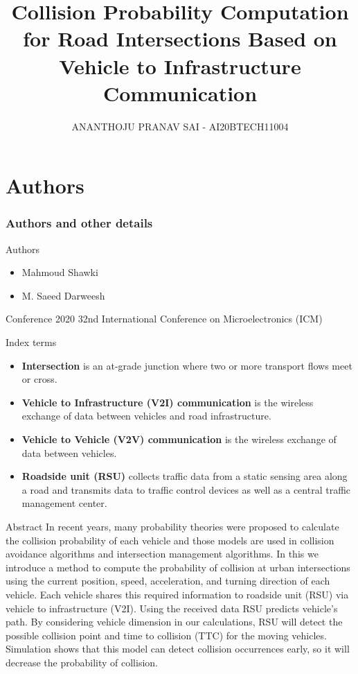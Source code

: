 \documentclass{beamer}
\title{Collision Probability Computation for Road
Intersections Based on Vehicle to Infrastructure
Communication}
\author{ANANTHOJU PRANAV SAI - AI20BTECH11004}
\begin{document}
\begin{frame}
\titlepage
\end{frame}
\section{Authors}
\begin{frame}
\frametitle{Authors and other details}
\begin{block}{Authors}
\begin{itemize}
    \item Mahmoud Shawki
    \item M. Saeed Darweesh
\end{itemize}
\end{block}
\begin{block}{Conference}
2020 32nd International Conference on Microelectronics (ICM)
\end{block}
\end{frame}
\begin{frame}
    \begin{block}{Index terms }
        \begin{itemize}
            \item \textbf{Intersection} is an at-grade junction where two or more transport flows meet or cross.                                         \item \textbf{Vehicle to Infrastructure (V2I) communication} is the wireless exchange of data between vehicles and road infrastructure.
            \item \textbf{Vehicle to Vehicle (V2V) communication} is the wireless exchange of data between vehicles.
            \item \textbf{Roadside unit (RSU)} collects traffic data from a static sensing area along a road and transmits data to traffic control devices as well as a central traffic management center.
        \end{itemize}
    \end{block}
\end{frame}
\begin{frame}
\begin{block}{Abstract}
    In recent years, many probability theories were proposed to calculate the collision probability of each vehicle and those models are used in collision avoidance algorithms and intersection management algorithms. In this we introduce a method to compute the probability of collision at urban intersections using the current position, speed, acceleration, and turning direction of each vehicle. Each vehicle shares this required information to roadside unit (RSU) via vehicle to infrastructure (V2I). Using the received data RSU predicts vehicle's path. By considering vehicle dimension in our calculations, RSU will detect the possible collision point and time to collision (TTC) for the moving vehicles. Simulation shows that this model can detect collision occurrences early, so it will decrease the probability of collision.
\end{block}
\end{frame}
\end{document}
